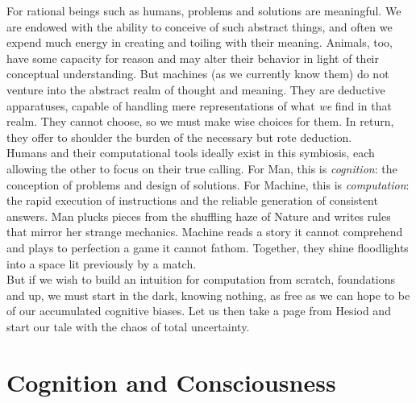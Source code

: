 For rational beings such as humans, problems and solutions are meaningful. We are endowed with the ability to conceive of such abstract things, and often we expend much energy in creating and toiling with their meaning. Animals, too, have some capacity for reason and may alter their behavior in light of their conceptual understanding. But machines (as we currently know them) do not venture into the abstract realm of thought and meaning. They are deductive apparatuses, capable of handling mere representations of what \textit{we} find in that realm. They cannot choose, so we must make wise choices for them. In return, they offer to shoulder the burden of the necessary but rote deduction. \\

Humans and their computational tools ideally exist in this symbiosis, each allowing the other to focus on their true calling. For Man, this is \textit{cognition}: the conception of problems and design of solutions. For Machine, this is \textit{computation}: the rapid execution of instructions and the reliable generation of consistent answers. Man plucks pieces from the shuffling haze of Nature and writes rules that mirror her strange mechanics. Machine reads a story it cannot comprehend and plays to perfection a game it cannot fathom. Together, they shine floodlights into a space lit previously by a match. \\

But if we wish to build an intuition for computation from scratch, foundations and up, we must start in the dark, knowing nothing, as free as we can hope to be of our accumulated cognitive biases. Let us then take a page from Hesiod and start our tale with the chaos of total uncertainty. \\


\toclineskip
\section{Cognition and Consciousness}


